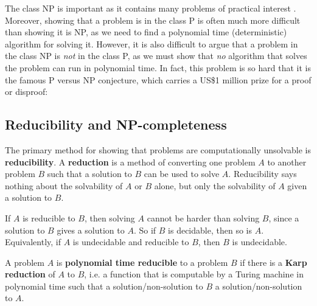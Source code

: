 
The class NP is important as it contains many problems of practical interest . Moreover, showing that a problem is in the class P is often much more difficult than showing it is NP, as we need to find a polynomial time (deterministic) algorithm for solving it. However, it is also difficult to argue that a problem in the class NP is \textit{not} in the class P, as we must show that \textit{no} algorithm that solves the problem can run in polynomial time. In fact, this problem is so hard that it is the famous $\mathrm{P}$ versus $\mathrm{NP}$ conjecture, which carries a US\$1 million prize for a proof or disproof:

\begin{conjecture}\label{conj:P_equals_NP}
\end{conjecture}

\subsection{Reducibility and NP-completeness}

The primary method for showing that problems are computationally unsolvable is \textbf{reducibility}. A \textbf{reduction} is a method of converting one problem $A$ to another problem $B$ such that a solution to $B$ can be used to solve $A$. Reducibility says nothing about the solvability of $A$ or $B$ alone, but only the solvability of $A$ given a solution to $B$. 

If $A$ is reducible to $B$, then solving $A$ cannot be harder than solving $B$, since a solution to $B$ gives a solution to $A$. So if $B$ is decidable, then so is $A$. Equivalently, if $A$ is undecidable and reducible to $B$, then $B$ is undecidable.

\begin{definition}\label{def:Karp_reduction}
    A problem $A$ is \textbf{polynomial time reducible} to a problem $B$ if there is a \textbf{Karp reduction} of $A$ to $B$, i.e. a function that is computable by a Turing machine in polynomial time such that a solution/non-solution to $B$  a solution/non-solution to $A$.
\end{definition}

